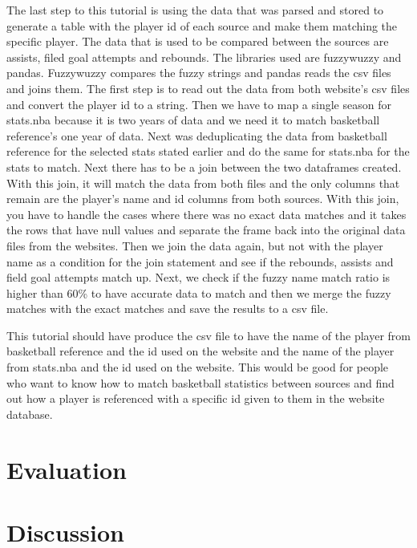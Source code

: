 \documentclass[10pt,twocolumn]{article}
\begin{document}
The last step to this tutorial is using the data that was parsed and stored to generate a table with the player id of each source and make them matching the specific player. The data that is used to be compared between the sources are assists, filed goal attempts and rebounds. The libraries used are fuzzywuzzy and pandas. Fuzzywuzzy compares the fuzzy strings and pandas reads the csv files and joins them. The first step is to read out the data from both website's csv files and convert the player id to a string. Then we have to map a single season for stats.nba because it is two years of data and we need it to match basketball reference's one year of data. Next was deduplicating the data from basketball reference for the selected stats stated earlier and do the same for stats.nba for the stats to match. Next there has to be a join between the two dataframes created. With this join, it will match the data from both files and the only columns that remain are the player's name and id columns from both sources. With this join, you have to handle the cases where there was no exact data matches and it takes the rows that have null values and separate the frame back into the original data files from the websites. Then we join the data again, but not with the player name as a condition for the join statement and see if the rebounds, assists and field goal attempts match up. Next, we check if the fuzzy name match ratio is higher than 60\% to have accurate data to match and then we merge the fuzzy matches with the exact matches and save the results to a csv file. 

This tutorial should have produce the csv file to have the name of the player from basketball reference and the id used on the website and the name of the player from stats.nba and the id used on the website. This would be good for people who want to know how to match basketball statistics between sources and find out how a player is referenced with a specific id given to them in the website database.


\section{Evaluation}

\section{Discussion}



\printbibliography 
\end{document}
